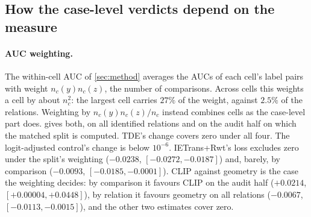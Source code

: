 \begin{table}[t]
\centering
\footnotesize
\setlength\tabcolsep{4pt}
\caption{\textbf{The split under a label shift.} Matched quadratic split on the benchmark's
labels and with every predicate of a cell given equal weight. Upper block: the scene-graph
audit (\cref{sec:sggaudit}); middle block: the real-pixel study (\cref{sec:vgvisual}); lower
block: within-cell AUC change under the same two weightings (image bootstrap). Split
intervals: delete-a-group jackknife over images.}
\label{tab:labelshift}

\end{table}

\begin{table}[t]
\centering
\scriptsize
\setlength\tabcolsep{1.5pt}
\caption{\textbf{Case-level part along the path of label mixes} $w^\alpha$ ($\alpha=0$: the
benchmark; $\alpha=1$: uniform within cells), matched quadratic score, jackknife intervals;
last row: Kish effective sample size.}
\label{tab:labelshiftpath}

\end{table}

\subsection{How the case-level verdicts depend on the measure}\label{app:rankrob}

\paragraph{AUC weighting.} The within-cell AUC of \cref{sec:method} averages the AUCs of each
cell's label pairs with weight $n_c(y)n_c(z)$, the number of comparisons. Across cells this
weights a cell by about $n_c^2$: the largest cell carries $27\%$ of the weight, against $2.5\%$
of the relations. Weighting by $n_c(y)n_c(z)/n_c$ instead combines cells as the case-level
part does.  gives both, on all identified relations and on the audit
half on which the matched split is computed. TDE's change covers zero under all four. The
logit-adjusted control's change is below $10^{-6}$. IETrans+Rwt's loss excludes zero
under the split's weighting ($-0.0238$, $[-0.0272,-0.0187]$) and, barely, by comparison
($-0.0093$, $[-0.0185,-0.0001]$). CLIP
against geometry is the case the weighting decides: by comparison it favours CLIP on the audit
half ($+0.0214$, $[+0.00004,+0.0448]$), by relation it favours geometry on all relations
($-0.0067$, $[-0.0113,-0.0015]$), and the other two estimates cover zero.

